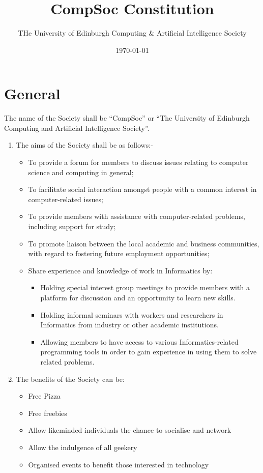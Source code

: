 \documentclass[a4paper]{article}
\begin{document}
\title{CompSoc Constitution}
\author{THe University of Edinburgh Computing \& Artificial Intelligence Society}
\date{\today{}}
\maketitle

\section{General}

The name of the Society shall be ``CompSoc'' or ``The University of
Edinburgh Computing and Artificial Intelligence Society''.

\begin{enumerate}
  \item The aims of the Society shall be as follows:-
    \begin{itemize}
      \item To provide a forum for members to discuss issues relating to computer science and computing in general;
      \item To facilitate social interaction amongst people with a common interest in computer-related issues;
      \item To provide members with assistance with computer-related problems, including support for study;
      \item To promote liaison between the local academic and business communities, with regard to fostering future employment opportunities;
      \item Share experience and knowledge of work in Informatics by:
        \begin{itemize}
          \item Holding special interest group meetings to provide members with a platform for discussion and an opportunity to learn new skills.
          \item Holding informal seminars with workers and researchers in Informatics from industry or other academic institutions.
          \item Allowing members to have access to various Informatics-related programming tools in order to gain experience in using them to solve related problems.
        \end{itemize}
    \end{itemize}


  \item The benefits of the Society can be:
    \begin{itemize}
      \item Free Pizza
      \item Free freebies
      \item Allow likeminded individuals the chance to socialise and network
      \item Allow the indulgence of all geekery
      \item Organised events to benefit those interested in technology
    \end{itemize}
    


\end{enumerate}
\end{document}
